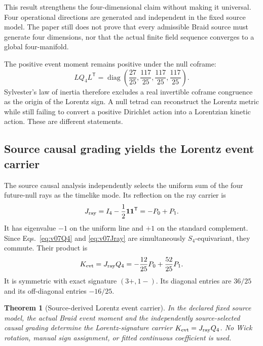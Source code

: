 \documentclass[11pt]{article}
\newtheorem{theorem}{Theorem}[section]
\theoremstyle{definition}
\theoremstyle{remark}
\begin{document}
This result strengthens the four-dimensional claim without making it universal. Four operational directions are generated and independent in the fixed source model. The paper still does not prove that every admissible Braid source must generate four dimensions, nor that the actual finite field sequence converges to a global four-manifold.

The positive event moment remains positive under the null coframe:
\begin{equation}\label{eq:v07positivepush}
 LQ_4L^{\mathsf T}=\operatorname{diag}\!\left(
 \frac{27}{25},\frac{117}{25},\frac{117}{25},\frac{117}{25}
 \right).
\end{equation}
Sylvester's law of inertia therefore excludes a real invertible coframe congruence as the origin of the Lorentz sign. A null tetrad can reconstruct the Lorentz metric while still failing to convert a positive Dirichlet action into a Lorentzian kinetic action. These are different statements.

\subsection{Source causal grading yields the Lorentz event carrier}

The source causal analysis independently selects the uniform sum of the four future-null rays as the timelike mode. Its reflection on the ray carrier is
\begin{equation}\label{eq:v07Jray}
 J_{\rm ray}=I_4-\frac12\mathbf1\mathbf1^{\mathsf T}
 =-P_0+P_1.
\end{equation}
It has eigenvalue $-1$ on the uniform line and $+1$ on the standard complement. Since Eqs.~\eqref{eq:v07Q4} and \eqref{eq:v07Jray} are simultaneously $S_4$-equivariant, they commute. Their product is
\begin{equation}\label{eq:v07Kevt}
 K_{\rm evt}=J_{\rm ray}Q_4
 =-\frac{12}{25}P_0+\frac{52}{25}P_1.
\end{equation}
It is symmetric with exact signature $(3+,1-)$. Its diagonal entries are $36/25$ and its off-diagonal entries $-16/25$.

\begin{theorem}[Source-derived Lorentz event carrier]\label{thm:v07carrier}
In the declared fixed source model, the actual Braid event moment and the independently source-selected causal grading determine the Lorentz-signature carrier $K_{\rm evt}=J_{\rm ray}Q_4$. No Wick rotation, manual sign assignment, or fitted continuous coefficient is used.
\end{theorem}
\end{document}
